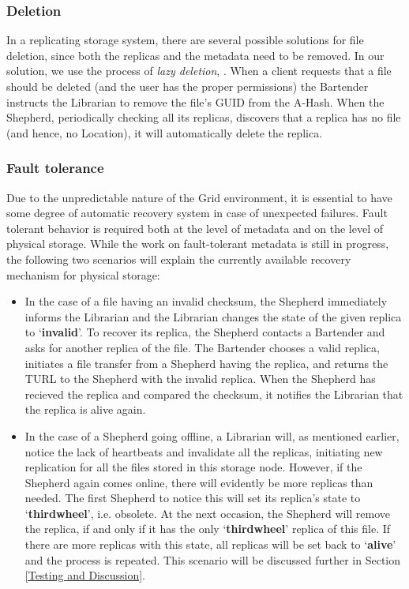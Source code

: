 \documentclass[final]{ieee}
\begin{document}
\subsubsection{Deletion}
\label{Deletion}
In a replicating storage system, there are several possible solutions
for file deletion, since both the replicas and the metadata need to be
removed. In our solution, we use the process of \textit{lazy
  deletion}, \cite{LazyDeletion}. When a client requests that a file
should be deleted (and the user has the proper permissions) the
Bartender instructs the Librarian to remove the file's GUID from the
A-Hash. When the Shepherd, periodically checking all its replicas,
discovers that a replica has no file (and hence, no Location), it will
automatically delete the replica.

\subsubsection{Fault tolerance}
\label{Fault tolerance}

Due to the unpredictable nature of the Grid environment, it is essential to
have some degree of  automatic recovery system in case of unexpected
failures. Fault tolerant behavior is required both at the level of
metadata and on the level of physical storage. While the work on fault-tolerant metadata is still in
progress, the following two
scenarios will explain the currently available recovery mechanism for
physical storage: 
\begin{itemize}
\item In the case of a file having an invalid checksum, the Shepherd
immediately informs the Librarian and the Librarian changes the state of the given replica to
`\textbf{invalid}'. To recover its replica, the Shepherd contacts a
Bartender and asks for another replica of the file. The Bartender chooses a valid
replica, initiates a file transfer from a Shepherd having the replica,
and returns the TURL to the Shepherd with the invalid replica. When the
Shepherd has recieved the replica and compared the checksum, it notifies the
Librarian that the replica is alive again.  
\item In the case of a Shepherd going offline, a Librarian will,
  as mentioned earlier, notice the lack of heartbeats and invalidate all the
  replicas, initiating new replication for all the files stored in
  this storage node. However, if the Shepherd
  again comes online, there will evidently be more replicas than
  needed. The first Shepherd to notice this will set its replica's
  state to `\textbf{thirdwheel}', i.e. obsolete. At the next occasion,
  the Shepherd will remove the replica, if and only if it has the only
  `\textbf{thirdwheel}' replica of this file. If there are more
  replicas with this state, all replicas will be set back to
  `\textbf{alive}' and the process is repeated. This scenario will be discussed further in Section
  \ref{Testing and Discussion}.
\end{itemize}
\end{document}
